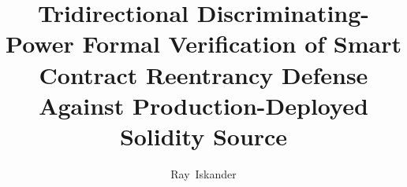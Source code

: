\documentclass[10pt,journal,compsoc]{IEEEtran}
\title{Tridirectional Discriminating-Power Formal Verification of Smart
Contract Reentrancy Defense Against Production-Deployed Solidity Source}
\author{Ray~Iskander
\IEEEcompsocitemizethanks{
\IEEEcompsocthanksitem Verdict Security, Independent Formal Verification Firm. E-mail: ray@verdictsecurity.com}}
\begin{document}
\maketitle
\begin{abstract}

\end{abstract}
\IEEEpeerreviewmaketitle

\end{document}
